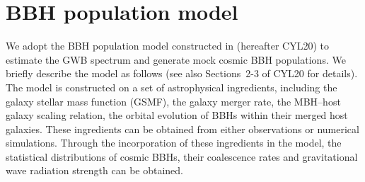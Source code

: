 \documentclass[twocolumn]{aastex631}
\begin{document}
\section{BBH population model}
%
\label{sec:BBHmodel}

We adopt the BBH population model constructed in \citet{CYL20bbh} (hereafter
CYL20) to estimate the GWB spectrum and generate mock cosmic BBH
populations.  We briefly describe the model as follows (see also Sections~2-3
of CYL20 for details). The model is constructed on a set of
astrophysical ingredients, including the galaxy stellar mass function (GSMF),
the galaxy merger rate, the MBH--host galaxy scaling relation, the orbital
evolution of BBHs within their merged host galaxies. These ingredients can be
obtained from either observations or numerical simulations.  Through the
incorporation of these ingredients in the model, the statistical distributions
of cosmic BBHs, their coalescence rates and gravitational wave radiation
strength can be obtained.
\end{document}
